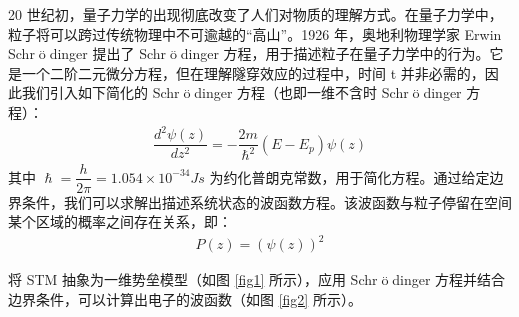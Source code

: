 \documentclass{article}
\begin{document}
20 世纪初，量子力学的出现彻底改变了人们对物质的理解方式。在量子力学中，粒子将可以跨过传统物理中不可逾越的“高山”。1926 年，奥地利物理学家 Erwin$\,$ Schr$\mathop{\text{o}}\limits^{..}$dinger 提出了 Schr$\mathop{\text{o}}\limits^{..}$dinger 方程，用于描述粒子在量子力学中的行为。它是一个二阶二元微分方程，但在理解隧穿效应的过程中，时间 t 并非必需的，因此我们引入如下简化的 Schr$\mathop{\text{o}}\limits^{..}$dinger 方程（也即一维不含时 Schr$\mathop{\text{o}}\limits^{..}$dinger 方程）：
\begin{align*}
	\dfrac{d^2\psi(z)}{dz^2} = -\dfrac{2m}{\hslash^2}(E-E_p)\psi(z)
\end{align*}
其中 $\hslash=\dfrac{h}{2\pi} =  1.054 \times10^{-34} Js$ 为约化普朗克常数，用于简化方程。通过给定边界条件，我们可以求解出描述系统状态的波函数方程。该波函数与粒子停留在空间某个区域的概率之间存在关系，即：
\begin{align*}
	P(z) = (\psi(z))^2
\end{align*}

将 STM 抽象为一维势垒模型（如图 \ref{fig1} 所示），应用 Schr$\mathop{\text{o}}\limits^{..}$dinger 方程并结合边界条件，可以计算出电子的波函数（如图 \ref{fig2} 所示）。
\end{document}
